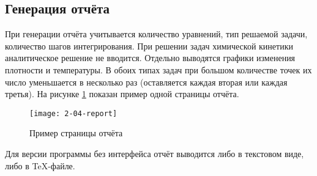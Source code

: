 \subsection{Генерация отчёта}

При генерации отчёта учитывается количество уравнений, тип решаемой задачи, количество шагов интегрирования. При решении задач химической
кинетики аналитическое решение не вводится. Отдельно выводятся графики изменения плотности и температуры. В обоих типах задач при
большом количестве точек их число уменьшается в несколько раз (оставляется каждая вторая или каждая третья). На рисунке \ref{fig:report}
показан пример одной страницы отчёта.

\begin{figure}
    \texttt{[image: 2-04-report]}
    \caption{Пример страницы отчёта}
    \label{fig:report}
\end{figure}

Для версии программы без интерфейса отчёт выводится либо в текстовом виде, либо в TeX-файле.
